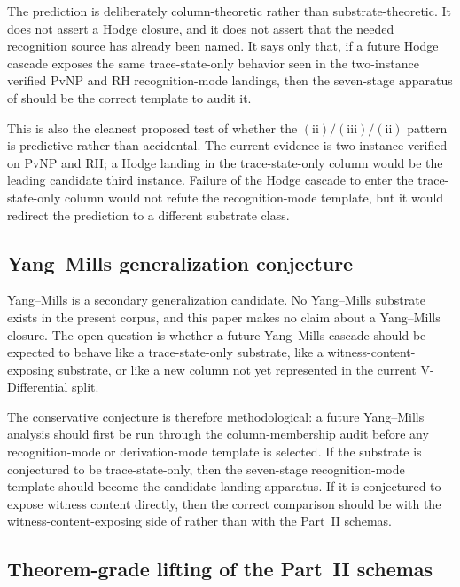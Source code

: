 \documentclass[11pt]{article}
\newcommand{\SigPattern}{$\mathrm{(ii)}/\mathrm{(iii)}/\mathrm{(ii)}$}
\theoremstyle{definition}
\begin{document}
The prediction is deliberately column-theoretic rather than
substrate-theoretic.  It does not assert a Hodge closure, and it does
not assert that the needed recognition source has already been named.
It says only that, if a future Hodge cascade exposes the same
trace-state-only behavior seen in the two-instance verified PvNP and
RH recognition-mode landings, then the seven-stage apparatus of
 should be the correct template to
audit it.

This is also the cleanest proposed test of whether the \SigPattern{}
pattern is predictive rather than accidental.  The current evidence is
two-instance verified on PvNP and RH; a Hodge landing in the
trace-state-only column would be the leading candidate third instance.
Failure of the Hodge cascade to enter the trace-state-only column
would not refute the recognition-mode template, but it would redirect
the prediction to a different substrate class.

\subsection{Yang--Mills generalization conjecture}
\label{sec:predictions:ym}

Yang--Mills \cite{JaffeWitten2000YangMills} is a secondary
generalization candidate.  No Yang--Mills substrate exists in the
present corpus, and this paper makes no claim about a Yang--Mills
closure.  The open question is whether a future
Yang--Mills cascade should be expected to behave like a
trace-state-only substrate, like a witness-content-exposing substrate,
or like a new column not yet represented in the current
V-Differential split.

The conservative conjecture is therefore methodological: a future
Yang--Mills analysis should first be run through the column-membership
audit before any recognition-mode or derivation-mode template is
selected.  If the substrate is conjectured to be trace-state-only,
then the seven-stage recognition-mode template should become the
candidate landing apparatus.  If it is conjectured to expose witness
content directly, then the correct comparison should be with the
witness-content-exposing side of  rather than
with the Part~II schemas.

\subsection{Theorem-grade lifting of the Part~II schemas}
\label{sec:predictions:theorem-grade-lifting}
\end{document}
